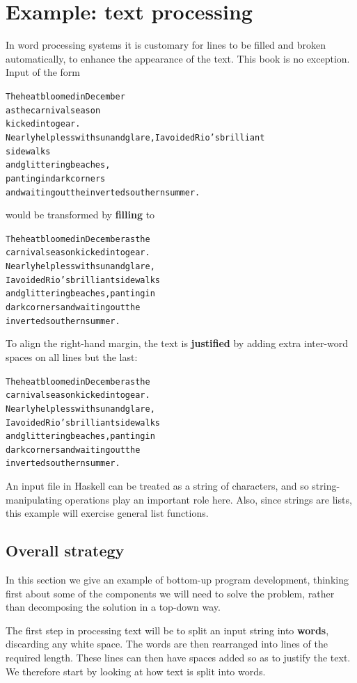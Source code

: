 \section{Example: text processing}
\label{textProc}

In word processing systems it is customary for lines to be filled and
broken automatically, to enhance the appearance of the
text. This book is no exception. Input of the form
\begin{alltt}
{\hskip1pc}The heat bloomed     in December
 as the   carnival  season
            kicked into  gear.
Nearly helpless with sun and glare, I avoided Rio's brilliant
sidewalks
  and glittering beaches,
panting in dark   corners
and waiting out the inverted southern summer.
\end{alltt}
would be transformed by \textbf{filling} to 
\begin{alltt}
{\hskip1pc}The heat bloomed in December as the
carnival season kicked into gear.
Nearly helpless with sun and glare,
I avoided Rio's brilliant sidewalks
and glittering beaches, panting in
dark corners and waiting out the
inverted southern summer.
\end{alltt}
To align the right-hand margin, the text is \textbf{justified} by adding extra
inter-word spaces on all lines but the last:
\begin{alltt}
{\hskip1pc}The heat bloomed in December as the
carnival  season  kicked into gear.
Nearly helpless with sun and glare,
I avoided Rio's brilliant sidewalks
and glittering beaches, panting  in
dark  corners  and  waiting out the
inverted southern summer.
\end{alltt}
An input file in Haskell can be
treated as a string of characters, and so string-manipulating operations
play an important role here. Also, since strings are lists, this example
will exercise general list functions.

\subsection*{Overall strategy}

In this section we give an example of bottom-up program development,
thinking first about some of the components we will need to solve the
problem, rather than decomposing the solution in a top-down way.

The first step in processing text will be to split an input string into 
\textbf{words}, discarding any white space. The words are then rearranged into
lines of the required length. These lines can then have spaces added so as to
justify the text. We therefore start by looking at how text is split into
words. 

